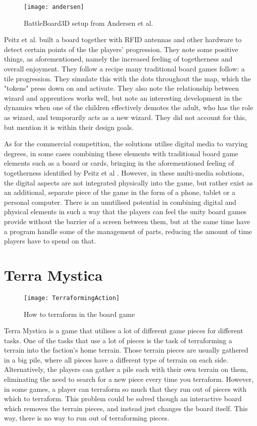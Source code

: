 \begin{figure}[!h]
\centering	
\texttt{[image: andersen]}
\caption{BattleBoard3D setup from Andersen et al.  \citep{andersen_designing_2004}}
\label{fig:andersen}
\end{figure}

Peitz et al. \citep{peitzWizards2006} built a board together with RFID antennas and other hardware to detect certain points of the the players' progression. They note some positive things, as aforementioned, namely the increased feeling of togetherness and overall enjoyment. They follow a recipe many traditional board games follow: a tile progression. They simulate this with the dots throughout the map, which the "tokens" press down on and activate. They also note the relationship between wizard and apprentices works well, but note an interesting development in the dynamics when one of the children effectively demotes the adult, who has the role as wizard, and temporarily acts as a new wizard. They did not account for this, but mention it is within their design goals.

As for the commercial competition, the solutions utilise digital media to varying degrees, in some cases combining these elements with traditional board game elements such as a board or cards, bringing in the aforementioned feeling of togetherness identified by Peitz et al \citep{peitzWizards2006}. However, in these multi-media solutions, the digital aspects are not integrated physically into the game, but rather exist as an additional, separate piece of the game in the form of a phone, tablet or a personal computer. There is an unutilised potential in combining digital and physical elements in such a way that the players can feel the unity board games provide without the barrier of a screen between them, but at the same time have a program handle some of the management of parts, reducing the amount of time players have to spend on that.

\section{Terra Mystica}
\begin{figure}[h!]
\centering \texttt{[image: TerraformingAction]}
\caption{How to terraform in the board game \label{Fig:TerraformingAction}}
\end{figure}
Terra Mystica is a game that utilises a lot of different game pieces for different tasks. One of the tasks that use a lot of pieces is the task of terraforming a terrain into the faction's home terrain. Those terrain pieces are usually gathered in a big pile, where all pieces have a different type of terrain on each side. Alternatively, the players can gather a pile each with their own terrain on them, eliminating the need to search for a new piece every time you terraform. However, in some games, a player can terraform so much that they run out of pieces with which to terraform. This problem could be solved though an interactive board which removes the terrain pieces, and instead just changes the board itself. This way, there is no way to run out of terraforming pieces.

